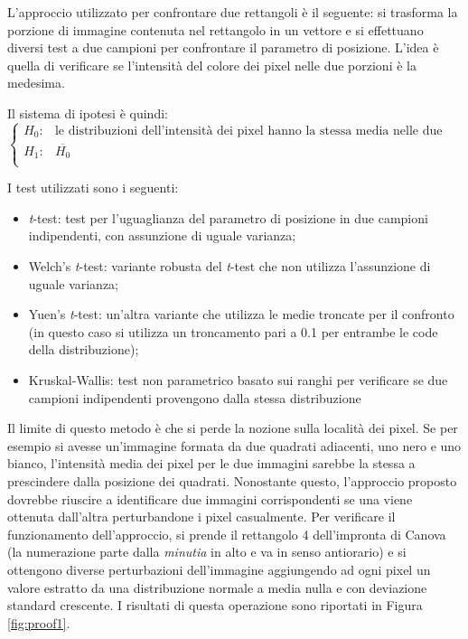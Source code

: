 \documentclass[12pt]{article}
\begin{document}
L'approccio utilizzato per confrontare due rettangoli è il seguente: si trasforma la porzione di immagine contenuta nel rettangolo in un vettore e si effettuano diversi test a due campioni per confrontare il parametro di posizione. L'idea è quella di verificare se l'intensità del colore dei pixel nelle due porzioni è la medesima.

Il sistema di ipotesi è quindi:
\begin{equation*}
    \begin{cases}
        H_0: & \text{le distribuzioni dell'intensità dei pixel hanno la stessa media nelle due immagini}\\
        H_1: & \overline{H_0}\\
    \end{cases}
\end{equation*}

I test utilizzati sono i seguenti:
\begin{itemize}
    \item \emph{t}-test: test per l'uguaglianza del parametro di posizione in due campioni indipendenti, con assunzione di uguale varianza;
    \item Welch's \emph{t}-test: variante robusta del \emph{t}-test che non utilizza l'assunzione di uguale varianza;
    \item Yuen's \emph{t}-test: un'altra variante che utilizza le medie troncate per il confronto (in questo caso si utilizza un troncamento pari a 0.1 per entrambe le code della distribuzione);
    \item Kruskal-Wallis: test non parametrico basato sui ranghi per verificare se due campioni indipendenti provengono dalla stessa distribuzione 
\end{itemize}

Il limite di questo metodo è che si perde la nozione sulla località dei pixel. Se per esempio si avesse un'immagine formata da due quadrati adiacenti, uno nero e uno bianco, l'intensità media dei pixel per le due immagini sarebbe la stessa a prescindere dalla posizione dei quadrati. Nonostante questo, l'approccio proposto dovrebbe riuscire a identificare due immagini corrispondenti se una viene ottenuta dall'altra perturbandone i pixel casualmente. Per verificare il funzionamento dell'approccio, si prende il rettangolo 4 dell'impronta di Canova (la numerazione parte dalla \emph{minutia} in alto e va in senso antiorario) e si ottengono diverse perturbazioni dell'immagine aggiungendo ad ogni pixel un valore estratto da una distribuzione normale a media nulla e con deviazione standard crescente. I risultati di questa operazione sono riportati in Figura \ref{fig:proof1}.
\end{document}
